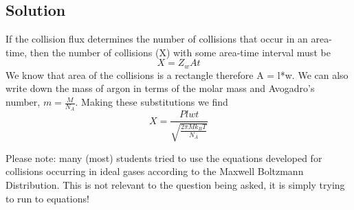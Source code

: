 \documentclass{article}
\newcommand{\be}{\begin{equation}}
\newcommand{\ee}{\end{equation}}
\begin{document}
\subsection*{Solution}
If the collision flux determines the number of collisions that occur in an area-time, then the number of collisions (X) with some area-time interval must be
\be
X = Z_w A t
\ee
We know that area of the collisions is a rectangle therefore A = l*w. 
We can also write down the mass of argon in terms of the molar mass and Avogadro's number, $m=\frac{M}{N_A}$.
Making these substitutions we find
\be
X = \frac{Plwt}{\sqrt{\frac{2\pi Mk_BT}{N_A} }}
\ee

Please note: many (most) students tried to use the equations developed for collisions occurring in ideal gases according to the Maxwell Boltzmann Distribution. 
This is not relevant to the question being asked, it is simply trying to run to equations!
\end{document}
